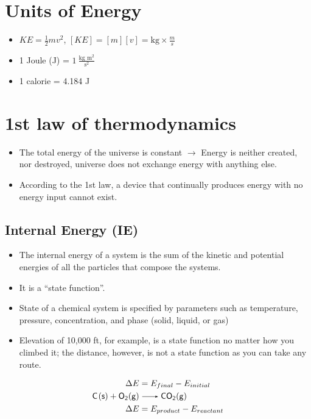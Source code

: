 \documentclass[
	chapter=6,
	title={Thermochemistry},
	showanswers=true,
]{chem122notes}
\begin{document}
\section{Units of Energy}\label{sec:units-of-energy}
\begin{itemize}
	\item $KE = \frac{1}{2}mv^{2}$, $[KE] = [m][v] = \mbox{kg}\times \frac{m}{s}$
	\item 1 Joule (J) = $1\ \frac{\mbox{kg } \mbox{m}^{2}}{\mbox{s}^{2}}$
	\item 1 calorie = 4.184 J
\end{itemize}

\section{1st law of thermodynamics}\label{sec:sec:1st-law-of-thermodynamics}
\begin{itemize}
	\item The total energy of the universe is constant $\rightarrow$ Energy is neither created, nor destroyed, universe does not exchange energy with anything else.
	\item According to the 1st law, a device that continually produces energy with no energy input cannot exist.
\end{itemize}

\subsection{Internal Energy (IE)}\label{subsec:internal-energy-(ie)}
\begin{itemize}
	\item The internal energy of a system is the sum of the kinetic and potential energies of all the particles that compose the systems.
	\item It is a ``state function''.
	\item State of a chemical system is specified by parameters such as temperature, pressure, concentration, and phase (solid, liquid, or gas)
	\item Elevation of 10,000 ft, for example, is a state function no matter how you climbed it;
	the distance, however, is not a state function as you can take any route.
\end{itemize}

\begin{equation*}
\begin{aligned}
	\Delta E &= E_{final} - E_{initial}\\
	\ce{C(s)} + \ce{O2(g)} &\ce{->} \ce{CO2(g)}\\
	\Delta E &= E_{product} - E_{reactant}\\
\end{aligned}
\end{equation*}
\end{document}
